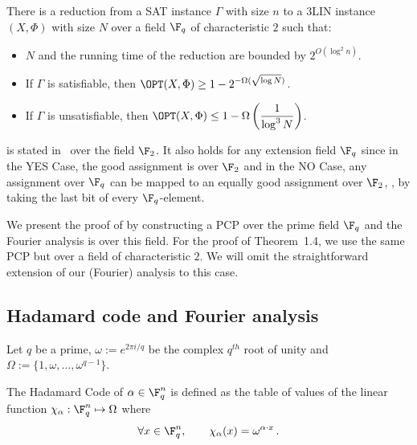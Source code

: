 \begin{theorem}\label{thm:kp} 
There is a reduction from a SAT instance $\Gamma$
with size $n$ to a 3LIN instance $(X,\Phi)$ with size $N$ over a field $\F_q$ of characteristic $2$
such that: \begin{itemize}
\item $N$ and the running time of the reduction are bounded by $2^{O(\log^2 n)}$.
\item If $\Gamma$ is satisfiable, then $\displaystyle\OPT(X, \Phi) \geq
1- 2^{-\Omega(\sqrt{\log N})}$.
\item If $\Gamma$ is unsatisfiable, then $\displaystyle\OPT(X, \Phi) \leq
1- \Omega\left( \frac{1}{\log^3 N}  \right)$.
\end{itemize}
\end{theorem}

\begin{remark}  is stated in~\cite{KhotPonnuswami} over the field $\F_2$. It also holds
for any extension field $\F_q$ since in the YES Case, the good assignment is over
$\F_2$ and in the NO Case, any assignment over $\F_q$ can be mapped
to an equally good assignment over $\F_2$, \eg, by taking the last bit of
every $\F_q$-element.
\end{remark}


\begin{remark} We present the proof of  by constructing a PCP over the prime field $\F_q$ and the Fourier analysis is over
this field. For the proof of Theorem~1.4, we use the same PCP but over
a field of characteristic $2$. We will omit the straightforward extension of our (Fourier) analysis to this case.
\end{remark}



\subsection{Hadamard code and Fourier analysis}

Let $q$ be a prime,   $\omega := e^{2\pi i/q}$ be the complex
$q^{th}$ root of unity and $\Omega := \{1, \omega, \ldots,
\omega^{q-1} \}$.

\begin{definition} 
%
%
The
%
Hadamard Code of $\alpha \in \F_q^n$ is defined
as the table of values of the linear function
 $\chi_\alpha: \F_q^n \mapsto \Omega$ where
  $$\forall x \in \F_q^n, \qquad  \chi_\alpha (x) = \omega^{\alpha \cdot  x}\,. $$
\end{definition}

